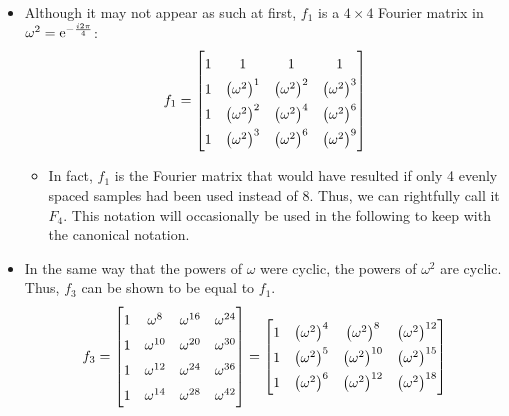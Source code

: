 \documentclass{article}
\begin{document}
\begin{itemize}
    \item Although it may not appear as such at first, $f_1$ is a $4\times 4$ Fourier matrix in $\omega^2 = \e[-\frac{i2\pi}{4}]$:
    \begin{equation*}
        f_1 =
        \renewcommand{\arraystretch}{1.5}
        \begin{bmatrix}
            1 & 1 & 1 & 1\\
            1 & \left( \omega^2 \right)^1 & \left( \omega^2 \right)^2 & \left( \omega^2 \right)^3\\
            1 & \left( \omega^2 \right)^2 & \left( \omega^2 \right)^4 & \left( \omega^2 \right)^6\\
            1 & \left( \omega^2 \right)^3 & \left( \omega^2 \right)^6 & \left( \omega^2 \right)^9\\
        \end{bmatrix}
    \end{equation*}
    \begin{itemize}
        \item In fact, $f_1$ is the Fourier matrix that would have resulted if only 4 evenly spaced samples had been used instead of 8. Thus, we can rightfully call it $F_4$. This notation will occasionally be used in the following to keep with the canonical notation.
    \end{itemize}
    \item In the same way that the powers of $\omega$ were cyclic, the powers of $\omega^2$ are cyclic. Thus, $f_3$ can be shown to be equal to $f_1$.
    \begin{equation*}
        f_3 =
        \begin{bmatrix}
            1 & \omega^8    & \omega^{16} & \omega^{24}\\
            1 & \omega^{10} & \omega^{20} & \omega^{30}\\
            1 & \omega^{12} & \omega^{24} & \omega^{36}\\
            1 & \omega^{14} & \omega^{28} & \omega^{42}\\
        \end{bmatrix}
        =
        \renewcommand{\arraystretch}{1.5}
        \begin{bmatrix}
            1 & \left( \omega^2 \right)^4 & \left( \omega^2 \right)^8    & \left( \omega^2 \right)^{12}\\
            1 & \left( \omega^2 \right)^5 & \left( \omega^2 \right)^{10} & \left( \omega^2 \right)^{15}\\
            1 & \left( \omega^2 \right)^6 & \left( \omega^2 \right)^{12} & \left( \omega^2 \right)^{18}\\

\end{bmatrix}
\end{equation*}
\end{itemize}
\end{document}
